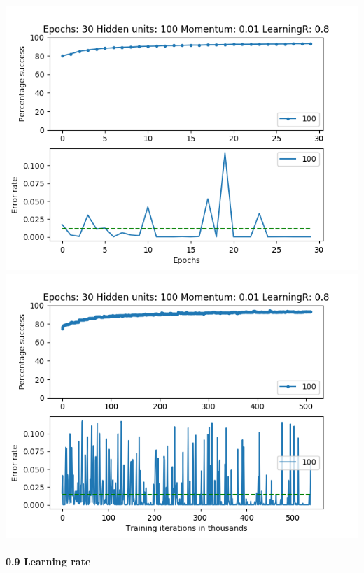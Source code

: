 \documentclass[11pt]{article}
\makeatletter
\def\maxwidth{\ifdim\Gin@nat@width>\linewidth\linewidth
    \else\Gin@nat@width\fi}
\let\Oldincludegraphics\includegraphics
\renewcommand{\includegraphics}[1]{\Oldincludegraphics[width=.8\maxwidth]{#1}}
\makeatother
\begin{document}
\includegraphics{Experiment2/E2_NN_Epoch_Momentum_0.01_30Epochs_100_LR_0.8_Hiddenunits.png}
\includegraphics{Experiment2/E2_NN_Training_Momentum_0.01_30Epochs_100_LR_0.8_Hiddenunits.png}

\hypertarget{learning-rate-9}{%
\paragraph{0.9 Learning rate}\label{learning-rate-9}}
\end{document}
